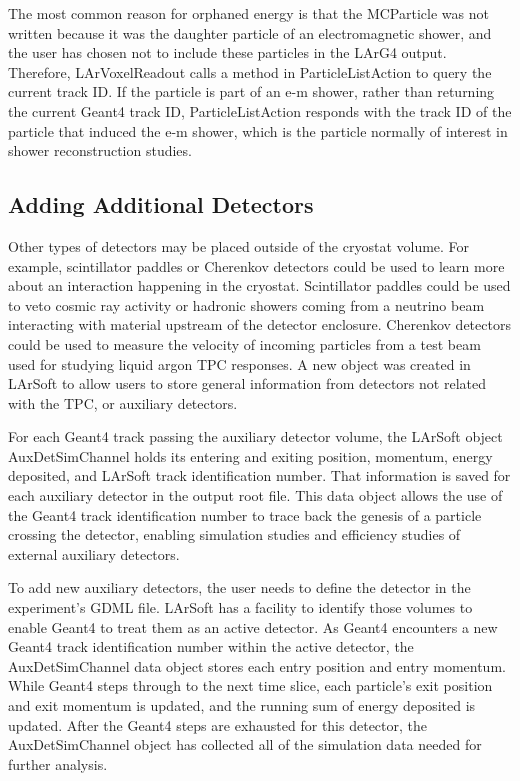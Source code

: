 \documentclass[12pt]{elsarticle}
\begin{document}
The most common reason for orphaned energy is that the MCParticle
was not written because it was the daughter
particle of an electromagnetic shower, and the user has chosen not to
include these particles in the LArG4 output. Therefore, LArVoxelReadout calls a method in ParticleListAction to query the current track ID. If the
particle is part of an e-m shower, rather than returning the current
Geant4 track ID, ParticleListAction responds with the
track ID of the particle that induced the e-m shower, which is the
particle normally of interest in shower reconstruction studies.

\subsection{Adding Additional Detectors}
Other types of detectors may be placed outside of the cryostat volume.
For example, scintillator paddles or Cherenkov detectors could be used to learn more about an interaction happening in the cryostat.
Scintillator paddles could be used to veto cosmic ray activity or hadronic showers coming from a neutrino beam interacting with material upstream of the detector enclosure.
Cherenkov detectors could be used to measure the velocity of incoming particles from a test beam used for studying liquid argon TPC responses.
A new object was created in LArSoft to allow users to store general information from detectors not related with the TPC, or auxiliary detectors.

For each Geant4 track passing the auxiliary detector volume, the LArSoft object AuxDetSimChannel holds its entering and exiting position, momentum, energy deposited, and LArSoft track identification number.
That information is saved for each auxiliary detector in the output root file.
This data object allows the use of the Geant4 track identification number to trace back the genesis of a particle crossing the detector, enabling simulation studies and efficiency studies of external auxiliary detectors.

To add new auxiliary detectors, the user needs to define the detector in the experiment's GDML file.
LArSoft has a facility to identify those volumes to enable Geant4 to treat them as an active detector.
As Geant4 encounters a new Geant4 track identification number within the active detector, the AuxDetSimChannel data object stores each entry position and entry momentum.
While Geant4 steps through to the next time slice, each particle's exit position and exit momentum is updated, and the running sum of energy deposited is updated. 
After the Geant4 steps are exhausted for this detector, the AuxDetSimChannel object has collected all of the simulation data needed for further analysis.
\end{document}
